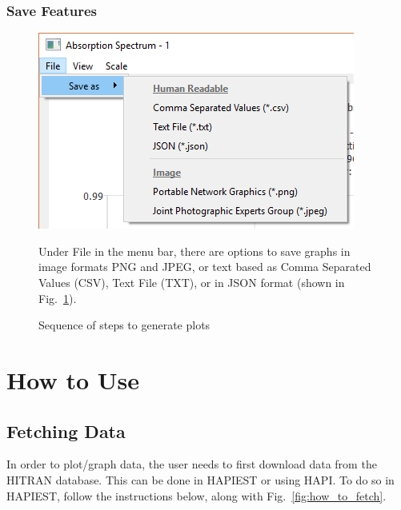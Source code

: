 \documentclass[12pt]{article}
\begin{document}
\subsubsection*{Save Features}
\begin{figure}[h]
\begin{minipage}[c]{0.3\textwidth}
\centering
\includegraphics[scale = 0.5]{GraphSave.png}
\caption{Sequence of steps to generate plots}
\label{fig:save}
\end{minipage}
\hfill\vline\hfill
\begin{minipage}[c]{0.6\textwidth}
Under File in the menu bar, there are options to save graphs in image formats PNG and JPEG, or  text based as Comma Separated Values (CSV), Text File (TXT), or in JSON format (shown in Fig.~\ref{fig:save}).
\end{minipage}
\end{figure}
\newpage
\section{How to Use}

\subsection{Fetching Data}
In order to plot/graph data, the user needs to first download data from the HITRAN database. This can be done in HAPIEST or using HAPI. To do so in HAPIEST, follow the instructions below, along with Fig.~\ref{fig:how_to_fetch}.
\end{document}
